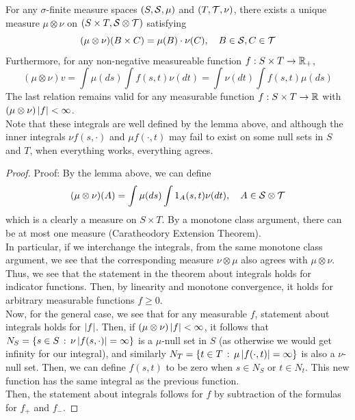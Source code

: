 \begin{theorem}
    For any $\sigma$-finite measure spaces $(S, \cal{S}, \mu)$ and $(T, \cal{T}, \nu)$, there exists a unique measure $\mu \otimes \nu$ on $(S \times T, \cal{S} \otimes \cal{T})$ satisfying
    \[ (\mu \otimes \nu)(B \times C) = \mu(B) \cdot \nu(C),\quad B \in \cal{S}, C \in \cal{T} \]
    Furthermore, for any non-negative measureable function $f : S \times T \to \R_{+}$, 
    \[ (\mu \otimes \nu)v = \int \mu(ds)\int f(s, t)\nu(dt) = \int \nu(dt) \int f(s, t) \mu(ds) \]
    The last relation remains valid for any measurable function $f : S \times T \to \R$ with $(\mu \otimes \nu)\abs{f} < \infty$.\\
    
    Note that these integrals are well defined by the lemma above, and although the inner integrals $\nu f(s, \cdot)$ and $\mu f(\cdot, t)$ may fail to exist on some null sets in $S$ and $T$, when everything works, everything agrees. 
\end{theorem}
\begin{proof}{Proof:}
    By the lemma above, we can define
    \[ (\mu \otimes \nu)(A) = \int \mu(ds)\int 1_{A}(s, t)\nu(dt), \quad A \in \cal{S} \otimes \cal{T} \]
    which is a clearly a measure on $S \times T$. By a monotone class argument, there can be at most one measure (Caratheodory Extension Theorem).\\

    In particular, if we interchange the integrals, from the same monotone class argument, we see that the corresponding measure $\nu \otimes \mu$ also agrees with $\mu \otimes \nu$. Thus, we see that the statement in the theorem about integrals holds for indicator functions. Then, by linearity and monotone convergence, it holds for arbitrary measurable functions $f \geq 0$.\\

    Now, for the general case, we see that for any measurable $f$, statement about integrals holds for $\abs{f}$. Then, if $(\mu \otimes \nu)\abs{f} < \infty$, it follows that $N_{S} = \{s \in S \col \nu\abs{f(s, \cdot)} = \infty\}$ is a $\mu$-null set in $S$ (as otherwise we would get infinity for our integral), and similarly $N_{T} = \{t \in T \col \mu\abs{f(\cdot, t)} = \infty\}$ is also a $\nu$-null set. Then, we can define $f(s, t)$ to  be zero when $s \in N_{S}$ or $t \in N_{t}$. This new function has the same integral as the previous function.\\

    Then, the statement about integrals follows for $f$ by subtraction of the formulas for $f_{+}$ and $f_{-}$. 

\end{proof}

